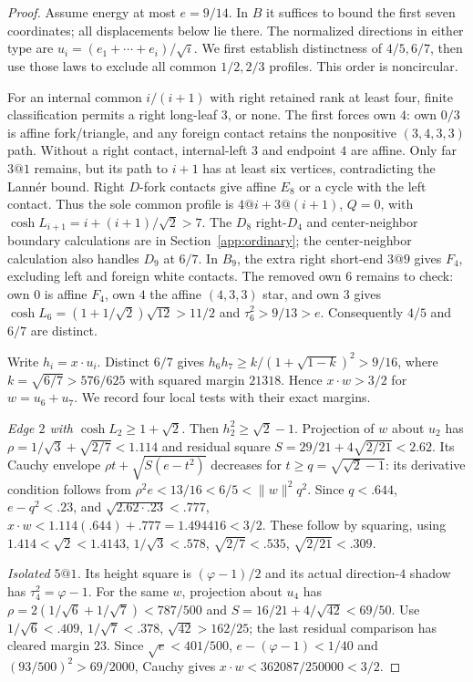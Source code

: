 \documentclass[11pt]{article}
\theoremstyle{definition}
\theoremstyle{remark}
\newcommand{\ph}{\varphi}
\begin{document}
\begin{proof}
Assume energy at most $e=9/14$. In $B$ it suffices to bound the first
seven coordinates; all displacements below lie there. The normalized
directions in either type are $u_i=(e_1+\cdots+e_i)/\sqrt i$.
We first establish distinctness of $4/5,6/7$, then use those laws to
exclude all common $1/2,2/3$ profiles. This order is noncircular.

For an internal common $i/(i+1)$ with right retained rank at least
four, finite classification permits a right long-leaf $3$, or none.
The first forces own $4$: own $0/3$ is affine fork/triangle, and
any foreign contact retains the nonpositive $(3,4,3,3)$ path.
Without a right contact, internal-left $3$ and endpoint $4$ are
affine. Only far $3@1$ remains, but its path to $i+1$ has at least
six vertices, contradicting the Lann\'er bound. Right $D$-fork
contacts give affine $E_8$ or a cycle with the left contact.
Thus the sole common profile is $4@i+3@(i+1)$, $Q=0$, with
$\cosh L_{i+1}=i+(i+1)/\sqrt2>7$.
The $D_8$ right-$D_4$ and center-neighbor boundary calculations are
in Section~\ref{app:ordinary}; the center-neighbor calculation also
handles $D_9$ at $6/7$.
In $B_9$, the extra right short-end $3@9$ gives $F_4$, excluding
left and foreign white contacts. The removed own $6$ remains to check:
own $0$ is affine $F_4$, own $4$ the affine $(4,3,3)$ star, and own
$3$ gives $\cosh L_6=(1+1/\sqrt2)\sqrt{12}>11/2$ and
$\tau_6^2>9/13>e$. Consequently $4/5$ and $6/7$ are distinct.

Write $h_i=x\cdot u_i$. Distinct $6/7$ gives
$h_6h_7\ge k/(1+\sqrt{1-k})^2>9/16$, where
$k=\sqrt{6/7}>576/625$ with squared margin $21318$.
Hence $x\cdot w>3/2$ for $w=u_6+u_7$.
We record four local tests with their exact margins.

\emph{Edge $2$ with $\cosh L_2\ge1+\sqrt2$.}
Then $h_2^2\ge\sqrt2-1$. Projection of $w$ about $u_2$ has
$\rho=1/\sqrt3+\sqrt{2/7}<1.114$ and residual square
$S=29/21+4\sqrt{2/21}<2.62$.
Its Cauchy envelope $\rho t+\sqrt{S(e-t^2)}$ decreases for
$t\ge q=\sqrt{\sqrt2-1}$: its derivative condition follows from
$\rho^2e<13/16<6/5<\|w\|^2q^2$.
Since $q<.644$, $e-q^2<.23$, and $\sqrt{2.62\cdot.23}<.777$,
$x\cdot w<1.114(.644)+.777=1.494416<3/2$.
These follow by squaring, using $1.414<\sqrt2<1.4143$,
$1/\sqrt3<.578$, $\sqrt{2/7}<.535$, $\sqrt{2/21}<.309$.

\emph{Isolated $5@1$.}
Its height square is $(\ph-1)/2$ and its actual direction-$4$
shadow has $\tau_4^2=\ph-1$. For the same $w$, projection about
$u_4$ has $\rho=2(1/\sqrt6+1/\sqrt7)<787/500$ and
$S=16/21+4/\sqrt{42}<69/50$. Use
$1/\sqrt6<.409$, $1/\sqrt7<.378$, $\sqrt{42}>162/25$;
the last residual comparison has cleared margin $23$.
Since $\sqrt e<401/500$, $e-(\ph-1)<1/40$ and
$(93/500)^2>69/2000$, Cauchy gives
$x\cdot w<362087/250000<3/2$.


\end{proof}
\end{document}
